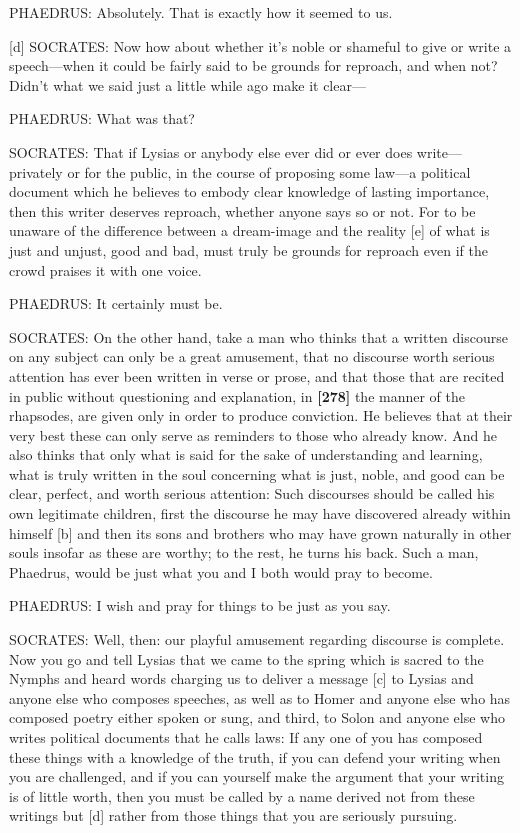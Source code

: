 PHAEDRUS: Absolutely. That is exactly how it seemed to us.

{[}d{]} SOCRATES: Now how about whether it's noble or shameful to give
or write a speech---when it could be fairly said to be grounds for
reproach, and when not? Didn't what we said just a little while ago make
it clear---

PHAEDRUS: What was that?

SOCRATES: That if Lysias or anybody else ever did or ever does
write---privately or for the public, in the course of proposing some
law---a political document which he believes to embody clear knowledge
of lasting importance, then this writer deserves reproach, whether
anyone says so or not. For to be unaware of the difference between a
dream-image and the reality {[}e{]} of what is just and unjust, good and
bad, must truly be grounds for reproach even if the crowd praises it
with one voice.

PHAEDRUS: It certainly must be.

SOCRATES: On the other hand, take a man who thinks that a written
discourse on any subject can only be a great amusement, that no
discourse worth serious attention has ever been written in verse or
prose, and that those that are recited in public without questioning and
explanation, in {\bf {[}278{]}} the manner of the rhapsodes, are given
only in order to produce conviction. He believes that at their very best
these can only serve as reminders to those who already know. And he also
thinks that only what is said for the sake of understanding and
learning, what is truly written in the soul concerning what is just,
noble, and good can be clear, perfect, and worth serious attention: Such
discourses should be called his own legitimate children, first the
discourse he may have discovered already within himself {[}b{]} and then
its sons and brothers who may have grown naturally in other souls
insofar as these are worthy; to the rest, he turns his back. Such a man,
Phaedrus, would be just what you and I both would pray to become.

PHAEDRUS: I wish and pray for things to be just as you say.

SOCRATES: Well, then: our playful amusement regarding discourse is
complete. Now you go and tell Lysias that we came to the spring which is
sacred to the Nymphs and heard words charging us to deliver a message
{[}c{]} to Lysias and anyone else who composes speeches, as well as to
Homer and anyone else who has composed poetry either spoken or sung, and
third, to Solon and anyone else who writes political documents that he
calls laws: If any one of you has composed these things with a knowledge
of the truth, if you can defend your writing when you are challenged,
and if you can yourself make the argument that your writing is of little
worth, then you must be called by a name derived not from these writings
but {[}d{]} rather from those things that you are seriously pursuing.

